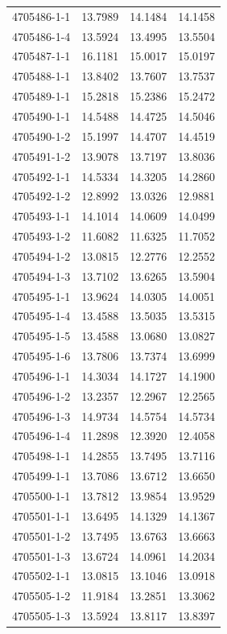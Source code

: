\begin{longtable}{lrrr}
4705486-1-1 & 13.7989 & 14.1484 & 14.1458 \\
4705486-1-4 & 13.5924 & 13.4995 & 13.5504 \\
4705487-1-1 & 16.1181 & 15.0017 & 15.0197 \\
4705488-1-1 & 13.8402 & 13.7607 & 13.7537 \\
4705489-1-1 & 15.2818 & 15.2386 & 15.2472 \\
4705490-1-1 & 14.5488 & 14.4725 & 14.5046 \\
4705490-1-2 & 15.1997 & 14.4707 & 14.4519 \\
4705491-1-2 & 13.9078 & 13.7197 & 13.8036 \\
4705492-1-1 & 14.5334 & 14.3205 & 14.2860 \\
4705492-1-2 & 12.8992 & 13.0326 & 12.9881 \\
4705493-1-1 & 14.1014 & 14.0609 & 14.0499 \\
4705493-1-2 & 11.6082 & 11.6325 & 11.7052 \\
4705494-1-2 & 13.0815 & 12.2776 & 12.2552 \\
4705494-1-3 & 13.7102 & 13.6265 & 13.5904 \\
4705495-1-1 & 13.9624 & 14.0305 & 14.0051 \\
4705495-1-4 & 13.4588 & 13.5035 & 13.5315 \\
4705495-1-5 & 13.4588 & 13.0680 & 13.0827 \\
4705495-1-6 & 13.7806 & 13.7374 & 13.6999 \\
4705496-1-1 & 14.3034 & 14.1727 & 14.1900 \\
4705496-1-2 & 13.2357 & 12.2967 & 12.2565 \\
4705496-1-3 & 14.9734 & 14.5754 & 14.5734 \\
4705496-1-4 & 11.2898 & 12.3920 & 12.4058 \\
4705498-1-1 & 14.2855 & 13.7495 & 13.7116 \\
4705499-1-1 & 13.7086 & 13.6712 & 13.6650 \\
4705500-1-1 & 13.7812 & 13.9854 & 13.9529 \\
4705501-1-1 & 13.6495 & 14.1329 & 14.1367 \\
4705501-1-2 & 13.7495 & 13.6763 & 13.6663 \\
4705501-1-3 & 13.6724 & 14.0961 & 14.2034 \\
4705502-1-1 & 13.0815 & 13.1046 & 13.0918 \\
4705505-1-2 & 11.9184 & 13.2851 & 13.3062 \\
4705505-1-3 & 13.5924 & 13.8117 & 13.8397 \\

\end{longtable}
